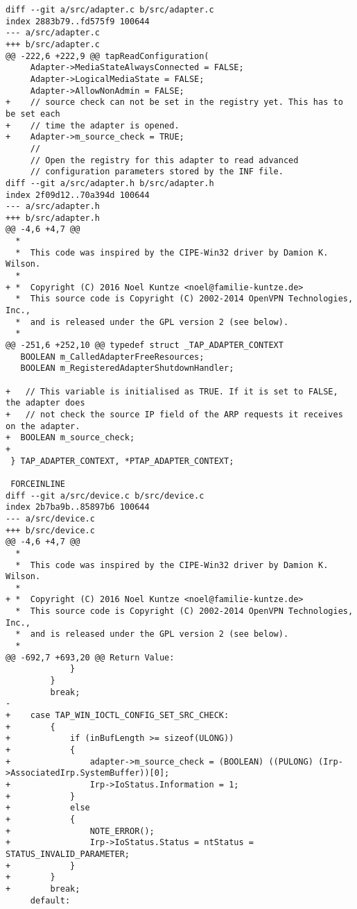\begin{center}
\label{lst:tap-windows-patch}
\begin{lstlisting}[caption=Patch für TAP-Windows6]
diff --git a/src/adapter.c b/src/adapter.c
index 2883b79..fd575f9 100644
--- a/src/adapter.c
+++ b/src/adapter.c
@@ -222,6 +222,9 @@ tapReadConfiguration(
     Adapter->MediaStateAlwaysConnected = FALSE;
     Adapter->LogicalMediaState = FALSE;
     Adapter->AllowNonAdmin = FALSE;
+    // source check can not be set in the registry yet. This has to be set each
+    // time the adapter is opened.
+    Adapter->m_source_check = TRUE;
     //
     // Open the registry for this adapter to read advanced
     // configuration parameters stored by the INF file.
diff --git a/src/adapter.h b/src/adapter.h
index 2f09d12..70a394d 100644
--- a/src/adapter.h
+++ b/src/adapter.h
@@ -4,6 +4,7 @@
  *
  *  This code was inspired by the CIPE-Win32 driver by Damion K. Wilson.
  * 
+ *  Copyright (C) 2016 Noel Kuntze <noel@familie-kuntze.de>
  *  This source code is Copyright (C) 2002-2014 OpenVPN Technologies, Inc.,
  *  and is released under the GPL version 2 (see below).
  *
@@ -251,6 +252,10 @@ typedef struct _TAP_ADAPTER_CONTEXT
   BOOLEAN m_CalledAdapterFreeResources;
   BOOLEAN m_RegisteredAdapterShutdownHandler;
 
+   // This variable is initialised as TRUE. If it is set to FALSE, the adapter does
+   // not check the source IP field of the ARP requests it receives on the adapter.
+  BOOLEAN m_source_check;
+
 } TAP_ADAPTER_CONTEXT, *PTAP_ADAPTER_CONTEXT;
 
 FORCEINLINE
diff --git a/src/device.c b/src/device.c
index 2b7ba9b..85897b6 100644
--- a/src/device.c
+++ b/src/device.c
@@ -4,6 +4,7 @@
  *
  *  This code was inspired by the CIPE-Win32 driver by Damion K. Wilson.
  *
+ *  Copyright (C) 2016 Noel Kuntze <noel@familie-kuntze.de>
  *  This source code is Copyright (C) 2002-2014 OpenVPN Technologies, Inc.,
  *  and is released under the GPL version 2 (see below).
  *
@@ -692,7 +693,20 @@ Return Value:
             }
         }
         break;
-
+    case TAP_WIN_IOCTL_CONFIG_SET_SRC_CHECK:
+        {
+            if (inBufLength >= sizeof(ULONG))
+            {
+                adapter->m_source_check = (BOOLEAN) ((PULONG) (Irp->AssociatedIrp.SystemBuffer))[0];
+                Irp->IoStatus.Information = 1;
+            }
+            else
+            {
+                NOTE_ERROR();
+                Irp->IoStatus.Status = ntStatus = STATUS_INVALID_PARAMETER;
+            }
+        }
+        break;
     default:
 

\end{lstlisting}
\end{center}
